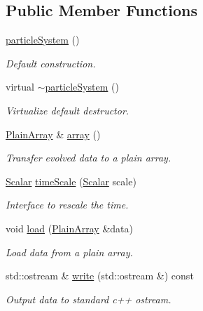 \subsection*{Public Member Functions}
\begin{DoxyCompactItemize}
\item 
\mbox{\hyperlink{classparticle_system_a6fcdf55bb3999bde562ef2ba22693c6d}{particle\+System}} ()
\begin{DoxyCompactList}\small\item\em Default construction. \end{DoxyCompactList}\item 
virtual \mbox{\hyperlink{classparticle_system_a14ddda3c186e335eb989790db240dd94}{$\sim$particle\+System}} ()
\begin{DoxyCompactList}\small\item\em Virtualize default destructor. \end{DoxyCompactList}\item 
\mbox{\hyperlink{classparticle_system_ae5a7215810a9f2cad5508aca6b26a063}{Plain\+Array}} \& \mbox{\hyperlink{classparticle_system_a1817956f802188c82c12c223c32bd28a}{array}} ()
\begin{DoxyCompactList}\small\item\em Transfer evolved data to a plain array. \end{DoxyCompactList}\item 
\mbox{\hyperlink{classparticle_system_a28e49da72c0ca5786d0611e6128a8994}{Scalar}} \mbox{\hyperlink{classparticle_system_a973f0cdc8c8ab21c65e57b8729207551}{time\+Scale}} (\mbox{\hyperlink{classparticle_system_a28e49da72c0ca5786d0611e6128a8994}{Scalar}} scale)
\begin{DoxyCompactList}\small\item\em Interface to rescale the time. \end{DoxyCompactList}\item 
void \mbox{\hyperlink{classparticle_system_a73609eb9d95e01724f9f56cb0d9f7ac7}{load}} (\mbox{\hyperlink{classparticle_system_ae5a7215810a9f2cad5508aca6b26a063}{Plain\+Array}} \&data)
\begin{DoxyCompactList}\small\item\em Load data from a plain array. \end{DoxyCompactList}\item 
std\+::ostream \& \mbox{\hyperlink{classparticle_system_a7f37791caaafd35f6c2d7afcc2a49b34}{write}} (std\+::ostream \&) const
\begin{DoxyCompactList}\small\item\em Output data to standard c++ ostream. \end{DoxyCompactList}\item 

\end{DoxyCompactItemize}
